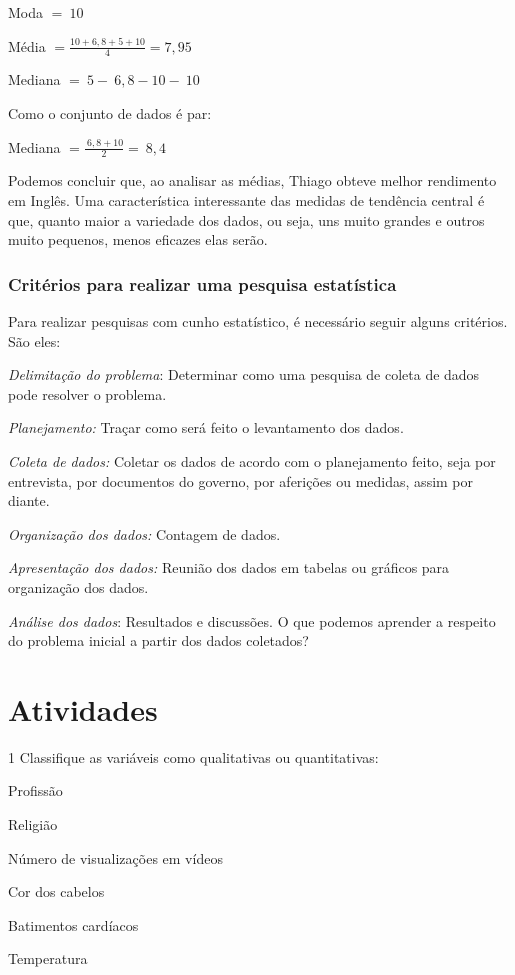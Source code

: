 {Moda $= \ 10$

Média $= \frac{10 + 6,8 + 5 + 10}{4} = 7,95$

Mediana $= \ 5 - \ 6,8  - 10 - \ 10\ $

Como o conjunto de dados é par:

Mediana $= \frac{\ 6,8 + 10}{2} = \ 8,4$

Podemos concluir que, ao analisar as médias, Thiago obteve melhor
rendimento em Inglês. Uma característica interessante das medidas de
tendência central é que, quanto maior a variedade dos dados, ou seja,
uns muito grandes e outros muito pequenos, menos eficazes elas serão.

\subsubsection{Critérios para realizar uma pesquisa estatística}

Para realizar pesquisas com cunho estatístico, é necessário seguir
alguns critérios. São eles:

\medskip \noindent \textit{Delimitação do problema}: Determinar como uma pesquisa de coleta
de dados pode resolver o problema.

\medskip \noindent \textit{Planejamento:} Traçar como será feito o levantamento dos dados.

\medskip \noindent \textit{Coleta de dados:} Coletar os dados de acordo com o planejamento
feito, seja por entrevista, por documentos do governo, por aferições ou
medidas, assim por diante.

\medskip \noindent \textit{Organização dos dados:} Contagem de dados.

\medskip \noindent \textit{Apresentação dos dados:} Reunião dos dados em tabelas ou
gráficos para organização dos dados.

\medskip \noindent \textit{Análise dos dados}: Resultados e discussões. O que podemos
aprender a respeito do problema inicial a partir dos dados coletados?
}

\section*{Atividades}

\num{1} Classifique as variáveis como qualitativas ou quantitativas:

\begin{escolha}[itemsep=0pt]

\item Profissão \ 

\item Religião \ 

\item Número de visualizações em vídeos \ 

\item Cor dos cabelos \ 

\item Batimentos cardíacos \ 

\item Temperatura \ 

\end{escolha}


